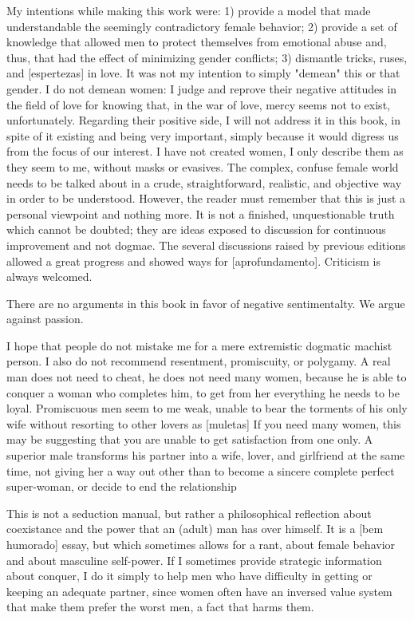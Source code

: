 My intentions while making this work were:
1) provide a model that made understandable the seemingly contradictory female behavior;
2) provide a set of knowledge that allowed men to protect themselves from emotional abuse and, thus, that had the effect of minimizing gender conflicts;
3) dismantle tricks, ruses, and [espertezas] in love.
It was not my intention to simply "demean" this or that gender.
I do not demean women: I judge and reprove their negative attitudes in the field of love for knowing that, in the war of love, mercy seems not to exist, unfortunately.
Regarding their positive side, I will not address it in this book, in spite of it existing and being very important, simply because it would digress us from the focus of our interest.
I have not created women, I only describe them as they seem to me, without masks or evasives.
The complex, confuse female world needs to be talked about in a crude, straightforward, realistic, and objective way in order to be understood.
However, the reader must remember that this is just a personal viewpoint and nothing more.
It is not a finished, unquestionable truth which cannot be doubted; they are ideas exposed to discussion for continuous improvement and not dogmae.
The several discussions raised by previous editions allowed a great progress and showed ways for [aprofundamento].
Criticism is always welcomed.

There are no arguments in this book in favor of negative sentimentalty.
We argue against passion.

I hope that people do not mistake me for a mere extremistic dogmatic machist person.
I also do not recommend resentment, promiscuity, or polygamy.
A real man does not need to cheat, he does not need many women, because he is able to conquer a woman who completes him, to get from her everything he needs to be loyal.
Promiscuous men seem to me weak, unable to bear the torments of his only wife without resorting to other lovers as [muletas]
If you need many women, this may be suggesting that you are unable to get satisfaction from one only.
A superior male transforms his partner into a wife, lover, and girlfriend at the same time, not giving her a way out other than to become a sincere complete perfect super-woman, or decide to end the relationship

This is not a seduction manual, but rather a philosophical reflection about coexistance and the power that an (adult) man has over himself.
It is a [bem humorado] essay, but which sometimes allows for a rant, about female behavior and about masculine self-power.
If I sometimes provide strategic information about conquer, I do it simply to help men who have difficulty in getting or keeping an adequate partner, since women often have an inversed value system that make them prefer the worst men, a fact that harms them.

